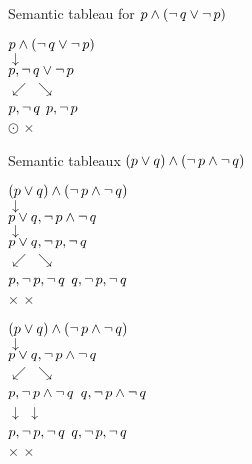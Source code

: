 \documentclass[style=simple,size=12pt]{powerdot}
\begin{document}
\begin{wideslide}[bm=,toc=]{Semantic tableau for $p\wedge (\mathop{\neg} q\vee \mathop{\neg} p)$}
\begin{center}
$p \wedge (\mathop{\neg} q \vee \mathop{\neg} p)$ \\
$\downarrow$ \\
$p,\mathop{\neg} q \vee \mathop{\neg} p$ \\
$\swarrow$ \hspace{2em} $\searrow$ \\
$p, \mathop{\neg} q$ \hspace{3em} $p, \mathop{\neg} p$ \\
$\odot$ \hspace*{5em} $\times$
\end{center}
\end{wideslide}

\begin{wideslide}[bm=,toc=]{Semantic tableaux $(p\vee q)\wedge (\mathop{\neg} p\wedge \mathop{\neg} q)$}
\vspace*{1cm}
\begin{minipage}[t]{0.4\textwidth}
\minisp
\begin{center}
$(p \vee q) \wedge (\mathop{\neg} p \wedge \mathop{\neg} q)$ \\
$\downarrow$ \\
$p \vee q, \mathop{\neg} p \wedge \mathop{\neg} q$ \\
$\downarrow$ \\
$p \vee q, \mathop{\neg} p, \mathop{\neg} q$ \\
$\swarrow$ \hspace{2em} $\searrow$ \\
$p,\mathop{\neg} p,\mathop{\neg} q$ \hspace{3em} $q, \mathop{\neg} p, \mathop{\neg} q$ \\
$\times$ \hspace{5em} $\times$
\end{center}
\end{minipage}
\hspace{0.07\textwidth}
\begin{minipage}[t]{0.4\textwidth}
\minisp
\begin{center}
$(p \vee q) \wedge (\mathop{\neg} p \wedge \mathop{\neg} q)$ \\
$\downarrow$ \\
$p \vee q, \mathop{\neg} p \wedge \mathop{\neg} q$ \\
$\swarrow$ \hspace{2em} $\searrow$ \\
$p,\mathop{\neg} p \wedge \mathop{\neg} q$ \hspace{3em} $q, \mathop{\neg} p\wedge  \mathop{\neg} q$ \\
$\downarrow$ \hspace{5em} $\downarrow$ \\
$p,\mathop{\neg} p,\mathop{\neg} q$ \hspace{3em} $q, \mathop{\neg} p, \mathop{\neg} q$ \\
$\times$ \hspace{5em} $\times$
\end{center}
\end{minipage}
\end{wideslide}
\end{document}
